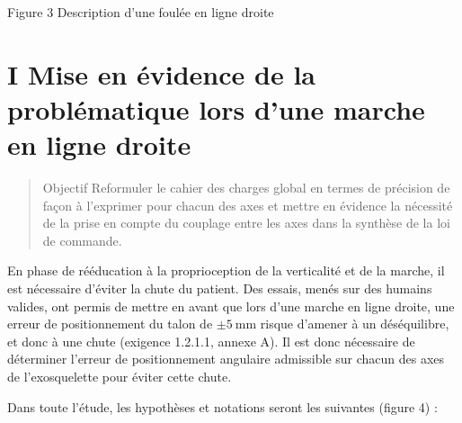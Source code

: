 \documentclass[10pt]{article}
\begin{document}
Figure 3 Description d'une foulée en ligne droite

\section*{I Mise en évidence de la problématique lors d'une marche en ligne droite }
\begin{abstract}
Objectif Reformuler le cahier des charges global en termes de précision de façon à l'exprimer pour chacun des axes et mettre en évidence la nécessité de la prise en compte du couplage entre les axes dans la synthèse de la loi de commande.
\end{abstract}

En phase de rééducation à la proprioception de la verticalité et de la marche, il est nécessaire d'éviter la chute du patient. Des essais, menés sur des humains valides, ont permis de mettre en avant que lors d'une marche en ligne droite, une erreur de positionnement du talon de $\pm 5 \mathrm{~mm}$ risque d'amener à un déséquilibre, et donc à une chute (exigence 1.2.1.1, annexe A). Il est donc nécessaire de déterminer l'erreur de positionnement angulaire admissible sur chacun des axes de l'exosquelette pour éviter cette chute.

Dans toute l'étude, les hypothèses et notations seront les suivantes (figure 4) :
\end{document}
